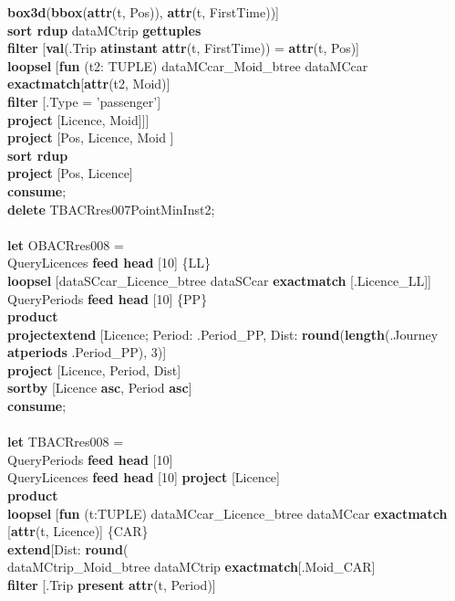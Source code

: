 \documentclass[a4paper]{article}
\newcommand{\op}[1]{\textbf{#1}}
\begin{document}
\begin{scriptsize}
\begin{tabbing}
\>\>\>\>\op{box3d}(\op{bbox}(\op{attr}(t, Pos)), \op{attr}(t, FirstTime))]\\
\>\>\op{sort rdup} dataMCtrip \op{gettuples}\\
\>\>\op{filter} [\op{val}(.Trip \op{atinstant} \op{attr}(t, FirstTime)) = \op{attr}(t, Pos)]\\
\>\>\op{loopsel} [\op{fun} (t2: TUPLE) dataMCcar\_Moid\_btree dataMCcar \op{exactmatch}[\op{attr}(t2, Moid)]\\
\>\>\>\op{filter} [.Type = 'passenger']\\
\>\>\>\op{project} [Licence, Moid]]]\\
\>\op{project} [Pos, Licence, Moid ]\\
\>\op{sort rdup}\\
\>\op{project} [Pos, Licence]\\
\op{consume};\\
\op{delete} TBACRres007PointMinInst2;\\
\\
\op{let} OBACRres008 =\\
\>QueryLicences \op{feed head} [10] \{LL\}\\
\>\>\op{loopsel} [dataSCcar\_Licence\_btree dataSCcar \op{exactmatch} [.Licence\_LL]]\\
\>QueryPeriods \op{feed head} [10] \{PP\}\\
\>\op{product}\\
\>\op{projectextend} [Licence; Period: .Period\_PP, Dist: \op{round}(\op{length}(.Journey \op{atperiods} .Period\_PP), 3)]\\
\>\op{project} [Licence, Period, Dist]\\
\>\op{sortby} [Licence \op{asc}, Period \op{asc}]\\
\op{consume};\\
\\
\op{let} TBACRres008 =\\
\>QueryPeriods \op{feed head} [10]\\
\>QueryLicences \op{feed head} [10] \op{project} [Licence]\\
\>\op{product}\\
\>\op{loopsel} [\op{fun} (t:TUPLE) dataMCcar\_Licence\_btree dataMCcar \op{exactmatch} [\op{attr}(t, Licence)] \{CAR\}\\
\>\>\op{extend}[Dist: \op{round}(\\
\>\>\>\>dataMCtrip\_Moid\_btree dataMCtrip \op{exactmatch}[.Moid\_CAR]\\
\>\>\>\>\op{filter} [.Trip \op{present} \op{attr}(t, Period)]\\

\end{tabbing}
\end{scriptsize}
\end{document}
